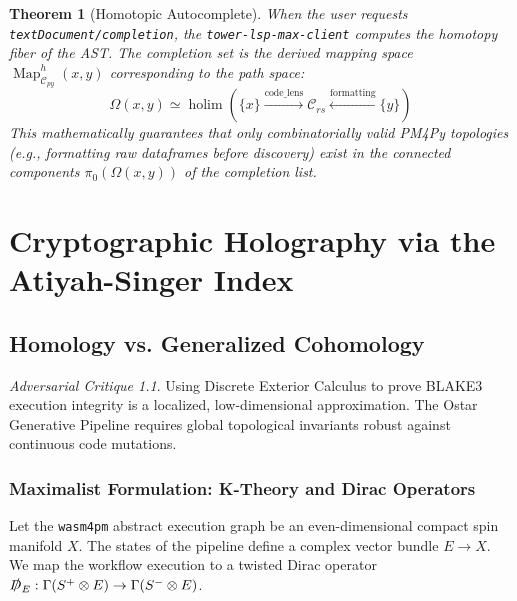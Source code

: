\documentclass[11pt,a4paper]{book}
\theoremstyle{definition}
\theoremstyle{plain}
\newtheorem{theorem}{Theorem}[section]
\theoremstyle{remark}
\newtheorem{critique}{Adversarial Critique}[section]
\begin{document}
\begin{theorem}[Homotopic Autocomplete]
When the user requests \texttt{textDocument/completion}, the \texttt{tower-lsp-max-client} computes the homotopy fiber of the AST. The completion set is the derived mapping space $\operatorname{Map}_{\mathscr{C}_{py}}^h (x, y)$ corresponding to the path space:
\begin{equation}
\Omega(x,y) \simeq \operatorname{holim} \left( \{x\} \xrightarrow{\text{code\_lens}} \mathscr{C}_{rs} \xleftarrow{\text{formatting}} \{y\} \right)
\end{equation}
This mathematically guarantees that only combinatorially valid PM4Py topologies (e.g., formatting raw dataframes before discovery) exist in the connected components $\pi_0(\Omega(x,y))$ of the completion list.
\end{theorem}

\chapter{Cryptographic Holography via the Atiyah-Singer Index}
\section{Homology vs. Generalized Cohomology}
\begin{critique}
Using Discrete Exterior Calculus to prove BLAKE3 execution integrity is a localized, low-dimensional approximation. The Ostar Generative Pipeline requires global topological invariants robust against continuous code mutations.
\end{critique}

\subsection{Maximalist Formulation: K-Theory and Dirac Operators}
Let the \texttt{wasm4pm} abstract execution graph be an even-dimensional compact spin manifold $X$. The states of the pipeline define a complex vector bundle $E \to X$. We map the workflow execution to a twisted Dirac operator $\slashed{D}_E: \Gamma(S^+ \otimes E) \to \Gamma(S^- \otimes E)$.
\end{document}
